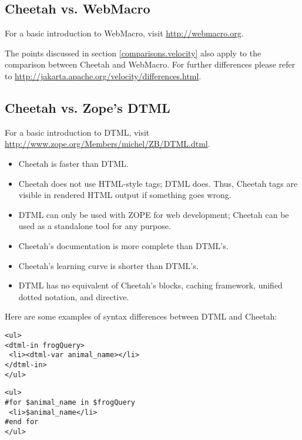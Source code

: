 \subsection{Cheetah vs. WebMacro}
\label{comparisons.webmacro}

For a basic introduction to WebMacro, visit
\url{http://webmacro.org}.

The points discussed in section \ref{comparisons.velocity} also apply to the
comparison between Cheetah and WebMacro.  For further differences please refer
to \url{http://jakarta.apache.org/velocity/differences.html}.

\subsection{Cheetah vs. Zope's DTML}
\label{comparisons.dtml}

For a basic introduction to DTML, visit
\url{http://www.zope.org/Members/michel/ZB/DTML.dtml}.

\begin{itemize}
\item Cheetah is faster than DTML.
\item Cheetah does not use HTML-style tags; DTML does.  Thus, Cheetah tags are
     visible in rendered HTML output if something goes wrong.
\item DTML can only be used with ZOPE for web development; Cheetah can be
     used as a standalone tool for any purpose.
\item Cheetah's documentation is more complete than DTML's.
\item Cheetah's learning curve is shorter than DTML's.
\item DTML has no equivalent of Cheetah's blocks, caching framework, 
     unified dotted notation, and  directive.
\end{itemize}

Here are some examples of syntax differences between DTML and Cheetah:
\begin{verbatim}
<ul>
<dtml-in frogQuery>
 <li><dtml-var animal_name></li>
</dtml-in>
</ul>
\end{verbatim}

\begin{verbatim}
<ul>
#for $animal_name in $frogQuery
 <li>$animal_name</li>
#end for
</ul>
\end{verbatim}

